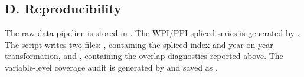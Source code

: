 \subsection*{D. Reproducibility}

\noindent The raw-data pipeline is stored in . The WPI/PPI spliced series is generated by . The script writes two files: , containing the spliced index and year-on-year transformation, and , containing the overlap diagnostics reported above. The variable-level coverage audit is generated by  and saved as .
